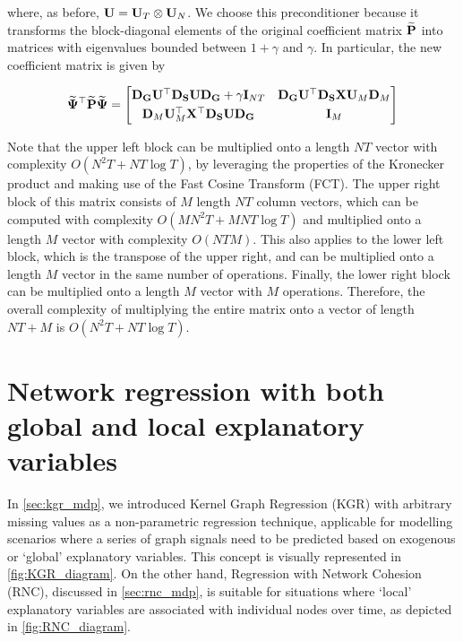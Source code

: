 where, as before, $\mathbf{U} = \mathbf{U}_T \otimes \mathbf{U}_N $. We choose this preconditioner because it transforms the block-diagonal elements of the original coefficient matrix $\widetilde{\mathbf{P}}$ into matrices with eigenvalues bounded between $1 + \gamma$ and $\gamma$. In particular, the new coefficient matrix is given by

\begin{equation*}
    \widetilde{\mathbf{\Psi}}^\top \widetilde{\mathbf{P}}  \widetilde{\mathbf{\Psi}} = 
       \begin{bmatrix}
        \mathbf{D}_{\mathbf{G}} \mathbf{U}^\top \mathbf{D}_{\mathbf{S}} \mathbf{U} \mathbf{D}_{\mathbf{G}} + \gamma \mathbf{I}_{NT}  &  \mathbf{D}_{\mathbf{G}} \mathbf{U}^\top \mathbf{D}_{\mathbf{S}} \mathbf{X} \mathbf{U}_M \mathbf{D}_M \\[0.1cm] 
        \mathbf{D}_M \mathbf{U}_M^\top \mathbf{X}^\top \mathbf{D}_{\mathbf{S}} \mathbf{U} \mathbf{D}_{\mathbf{G}} & \mathbf{I}_M
        \end{bmatrix}
\end{equation*}

Note that the upper left block can be multiplied onto a length $NT$ vector with complexity $O(N^2T + NT \log T)$, by leveraging the properties of the Kronecker product and making use of the Fast Cosine Transform (FCT). The upper right block of this matrix consists of $M$ length $NT$ column vectors, which can be computed with complexity $O(MN^2T + MNT \log T)$ and multiplied onto a length $M$ vector with complexity $O(NTM)$. This also applies to the lower left block, which is the transpose of the upper right, and can be multiplied onto a length $M$ vector in the same number of operations. Finally, the lower right block can be multiplied onto a length $M$ vector with $M$ operations. Therefore, the overall complexity of multiplying the entire matrix onto a vector of length $NT + M$ is $O(N^2T + NT \log T)$. 




\section{Network regression with both global and local explanatory variables}

In \cref{sec:kgr_mdp}, we introduced Kernel Graph Regression (KGR) with arbitrary missing values as a non-parametric regression technique, applicable for modelling scenarios where a series of graph signals need to be predicted based on exogenous or `global' explanatory variables. This concept is visually represented in \cref{fig:KGR_diagram}. On the other hand, Regression with Network Cohesion (RNC), discussed in \cref{sec:rnc_mdp}, is suitable for situations where `local' explanatory variables are associated with individual nodes over time, as depicted in \cref{fig:RNC_diagram}.

